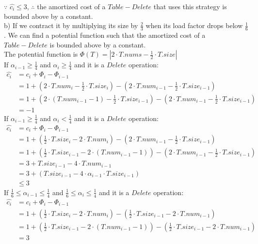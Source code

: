 \documentclass[12pt,letterpaper]{article}
\begin{document}
$\because$ $\widehat{c_i} \le 3$, $\therefore$ the amortized cost of a $Table-Delete$ that uses this strategy is bounded above by a constant. \\
b) If we contract it by multiplying its size by $\frac{2}{3}$ when its load factor drops below $\frac{1}{6}$.
We can find a potential function such that the amortized cost of a $Table−Delete$ is bounded above by a constant. \\
The potential function is $\Phi (T) = |2 \cdot T.nums - \frac{1}{2} \cdot T.size|$ \\
If $\alpha_{i-1} \ge \frac{1}{4}$ and $\alpha_{i} \ge \frac{1}{4}$ and it is a $Delete$ operation:
\begin{align*}
\widehat{c_i} &= c_i + \Phi_{i} - \Phi_{i-1} \\
&= 1 + (2 \cdot T.num_{i} - \frac{1}{2} \cdot T.size_{i}) - (2 \cdot T.num_{i-1} - \frac{1}{2} \cdot T.size_{i-1}) \\
&= 1 + (2 \cdot (T.num_{i-1} - 1) - \frac{1}{2} \cdot T.size_{i-1}) - (2 \cdot T.num_{i-1} - \frac{1}{2} \cdot T.size_{i-1}) \\
&= -1
\end{align*}
If $\alpha_{i-1} \ge \frac{1}{4}$ and $\alpha_{i} < \frac{1}{4}$ and it is a $Delete$ operation:
\begin{align*}
\widehat{c_i} &= c_i + \Phi_{i} - \Phi_{i-1} \\
&= 1 + (\frac{1}{2} \cdot T.size_{i} - 2 \cdot T.num_{i} ) - (2 \cdot T.num_{i-1} - \frac{1}{2} \cdot T.size_{i-1}) \\
&= 1 + (\frac{1}{2} \cdot T.size_{i-1} - 2 \cdot (T.num_{i-1} - 1)) - (2 \cdot T.num_{i-1} - \frac{1}{2} \cdot T.size_{i-1}) \\
&= 3 + T.size_{i-1} - 4 \cdot T.num_{i-1} \\
&= 3 + (T.size_{i-1} - 4 \cdot \alpha_{i-1} \cdot T.size_{i-1}) \\
&\le 3
\end{align*}
If $\frac{1}{6} \le \alpha_{i-1} \le \frac{1}{4}$ and $\frac{1}{6} \le \alpha_{i} \le \frac{1}{4}$ and it is a $Delete$ operation:
\begin{align*}
\widehat{c_i} &= c_i + \Phi_{i} - \Phi_{i-1} \\
&= 1 + ( \frac{1}{2} \cdot T.size_{i} - 2 \cdot T.num_{i} ) - ( \frac{1}{2} \cdot T.size_{i-1} - 2 \cdot T.num_{i-1} ) \\
&= 1 + ( \frac{1}{2} \cdot T.size_{i-1} - 2 \cdot (T.num_{i-1} - 1) ) - ( \frac{1}{2} \cdot T.size_{i-1} - 2 \cdot T.num_{i-1} ) \\
&= 3
\end{align*}
\end{document}
